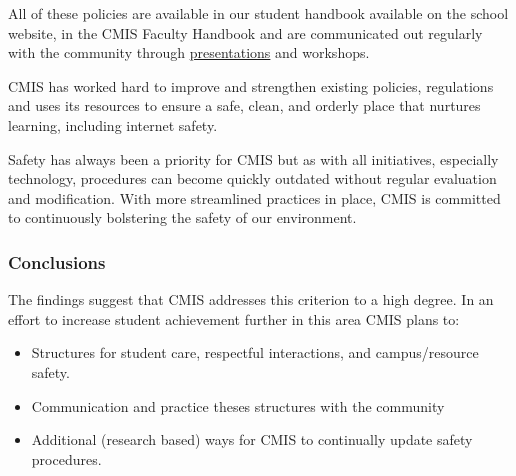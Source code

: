 \begin{findings}
All of these policies are available in our student handbook available on the school website, in the CMIS Faculty Handbook and are communicated out regularly with the community through \href{https://docs.google.com/a/cmis.ac.th/presentation/d/1QRUmBmMM63pQlvP0Qemq272VPojLj5sZv3GuweO9J-Q/edit?usp=sharing}{presentations} and workshops.


CMIS has worked hard to improve and strengthen existing policies, regulations and uses its resources to ensure a safe, clean, and orderly place that nurtures learning, including internet safety. 

Safety has always been a priority for CMIS but as with all initiatives, especially technology, procedures can become quickly outdated without regular evaluation and modification. With more streamlined practices in place, CMIS is committed to continuously bolstering the safety of our environment. 
\end{findings}

\subsubsection{Conclusions}
The findings suggest that CMIS addresses this criterion to a high degree. In an effort to increase student achievement further in this area CMIS plans to:

\begin{itemize}
\item Structures for student care, respectful interactions, and campus/resource safety.
\item Communication and practice theses structures with the community
\end{itemize}
\begin{itemize}
\item Additional (research based) ways for CMIS to continually update safety procedures.
\end{itemize}
